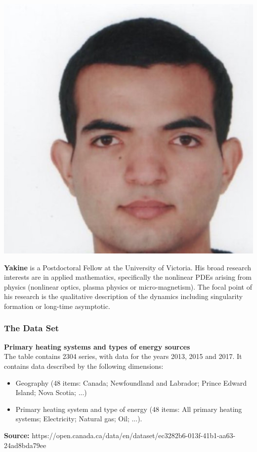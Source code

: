 \documentclass{beamer}
\begin{document}
\begin{frame}
\vspace{10pt}
\begin{minipage}[c]{0.15\textwidth}
\includegraphics[width=\textwidth, trim={60pt 0pt 0pt 0pt}, clip]{TeamPics/yakine.jpg}
\end{minipage}\hspace{0.05\textwidth}%
\begin{minipage}[c]{0.8\textwidth}
{\small \textbf{Yakine} is a Postdoctoral Fellow at the University of Victoria. His broad research interests are in applied mathematics,
specifically the nonlinear PDEs arising from physics (nonlinear optics, plasma physics or micro-magnetism). The focal point of his research is the qualitative description of the dynamics including singularity formation or long-time asymptotic. 
}
\end{minipage}


\end{frame}





\begin{frame}
\frametitle{The Data Set}
\textbf{Primary heating systems and types of energy sources}\\
The table contains 2304 series, with data for the years 2013, 2015 and 2017. 
It contains data described by the following dimensions:
\begin{itemize}
\item Geography (48 items: Canada; Newfoundland and Labrador; Prince Edward Island; Nova Scotia; ...)
\item Primary heating system and type of energy (48 items: All primary heating systems; Electricity; Natural gas; Oil; ...).
\end{itemize}
\textbf{Source:} {\scriptsize https://open.canada.ca/data/en/dataset/ec3282b6-013f-41b1-aa63-24ad8bda79ee}
\end{frame}
\end{document}
